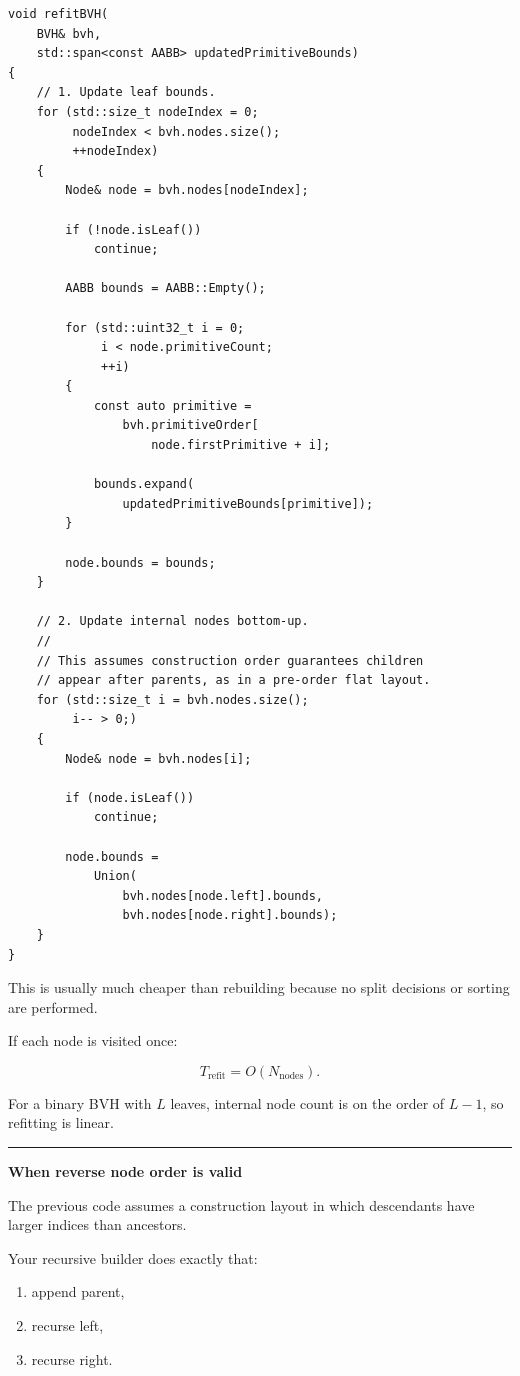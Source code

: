 \begin{verbatim}
void refitBVH(
    BVH& bvh,
    std::span<const AABB> updatedPrimitiveBounds)
{
    // 1. Update leaf bounds.
    for (std::size_t nodeIndex = 0;
         nodeIndex < bvh.nodes.size();
         ++nodeIndex)
    {
        Node& node = bvh.nodes[nodeIndex];

        if (!node.isLeaf())
            continue;

        AABB bounds = AABB::Empty();

        for (std::uint32_t i = 0;
             i < node.primitiveCount;
             ++i)
        {
            const auto primitive =
                bvh.primitiveOrder[
                    node.firstPrimitive + i];

            bounds.expand(
                updatedPrimitiveBounds[primitive]);
        }

        node.bounds = bounds;
    }

    // 2. Update internal nodes bottom-up.
    //
    // This assumes construction order guarantees children
    // appear after parents, as in a pre-order flat layout.
    for (std::size_t i = bvh.nodes.size();
         i-- > 0;)
    {
        Node& node = bvh.nodes[i];

        if (node.isLeaf())
            continue;

        node.bounds =
            Union(
                bvh.nodes[node.left].bounds,
                bvh.nodes[node.right].bounds);
    }
}
\end{verbatim}

This is usually much cheaper than rebuilding because no split decisions or sorting are performed.

If each node is visited once:

\[
T_{\text{refit}}=O(N_{\text{nodes}}).
\]

For a binary BVH with \(L\) leaves, internal node count is on the order of \(L-1\), so refitting is linear.

\begin{center}\rule{0.5\linewidth}{0.5pt}\end{center}

\textbf{When reverse node order is valid}

The previous code assumes a construction layout in which descendants have larger indices than ancestors.

Your recursive builder does exactly that:

\begin{enumerate}
\def\labelenumi{\arabic{enumi}.}
\tightlist
\item
  append parent,
\item
  recurse left,
\item
  recurse right.
\end{enumerate}

